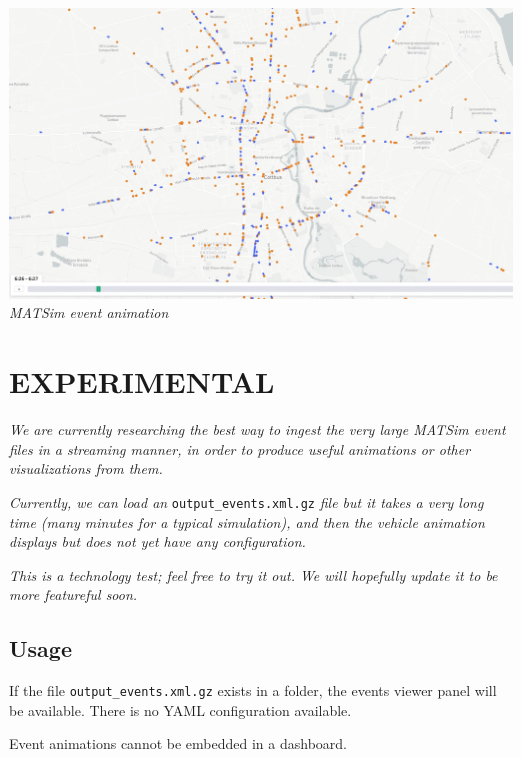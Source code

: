 \includegraphics{assets/events.jpg} \emph{MATSim event animation}

\hypertarget{experimental}{%
\section{EXPERIMENTAL}\label{experimental}}

\emph{We are currently researching the best way to ingest the very large
MATSim event files in a streaming manner, in order to produce useful
animations or other visualizations from them.}

\emph{Currently, we can load an} \texttt{output\_events.xml.gz}
\emph{file but it takes a very long time (many minutes for a typical
simulation), and then the vehicle animation displays but does not yet
have any configuration.}

\emph{This is a technology test; feel free to try it out. We will
hopefully update it to be more featureful soon.}

\hypertarget{usage}{%
\subsection{Usage}\label{usage}}

If the file \texttt{output\_events.xml.gz} exists in a folder, the
events viewer panel will be available. There is no YAML configuration
available.

Event animations cannot be embedded in a dashboard.
